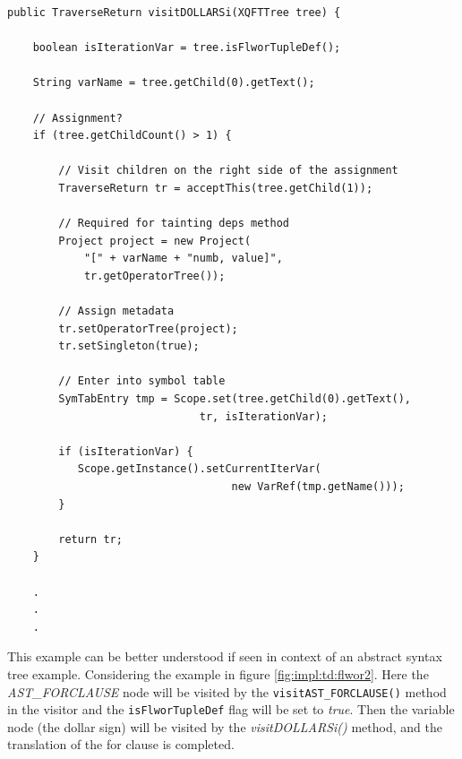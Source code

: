 \begin{Verbatim}
public TraverseReturn visitDOLLARSi(XQFTTree tree) {
      
    boolean isIterationVar = tree.isFlworTupleDef();
      
    String varName = tree.getChild(0).getText();
      
    // Assignment?
    if (tree.getChildCount() > 1) {
         
        // Visit children on the right side of the assignment
        TraverseReturn tr = acceptThis(tree.getChild(1));
          
        // Required for tainting deps method
        Project project = new Project(
            "[" + varName + "numb, value]", 
            tr.getOperatorTree());

        // Assign metadata
        tr.setOperatorTree(project);
        tr.setSingleton(true);
          
        // Enter into symbol table
        SymTabEntry tmp = Scope.set(tree.getChild(0).getText(), 
                              tr, isIterationVar);
          
        if (isIterationVar) {
           Scope.getInstance().setCurrentIterVar(
                                   new VarRef(tmp.getName()));
        }
          
        return tr;
    }

    .
    .
    .
\end{Verbatim}

This example can be better understood if seen in context of an abstract syntax
tree example. Considering the example in figure \ref{fig:impl:td:flwor2}. Here
the \textit{AST\_FORCLAUSE} node will be visited by the
\texttt{visitAST\_FORCLAUSE()} method in the visitor and the
\texttt{isFlworTupleDef} flag will be set to \textit{true}. Then the variable
node (the dollar sign) will be visited by the \textit{visitDOLLARSi()} method,
and the translation of the for clause is completed.

